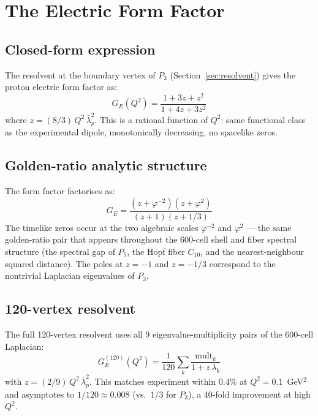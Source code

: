 \documentclass[12pt]{article}
\newcommand{\phig}{\varphi}
\newcommand{\lbar}{\bar{\lambda}}
\begin{document}
\section{The Electric Form Factor}\label{sec:formfactor}

\subsection{Closed-form expression}

The resolvent at the boundary vertex of $P_3$ (Section~\ref{sec:resolvent}) gives the proton electric form factor as:
\begin{equation}\label{eq:formfactor}
    G_E(Q^2) = \frac{1 + 3z + z^2}{1 + 4z + 3z^2}
\end{equation}
where $z = (8/3)\,Q^2\,\lbar_p^2$. This is a rational function of $Q^2$: same functional class as the experimental dipole, monotonically decreasing, no spacelike zeros.

\subsection{Golden-ratio analytic structure}

The form factor factorises as:
\begin{equation}
    G_E = \frac{(z + \phig^{-2})(z + \phig^2)}{(z + 1)(z + 1/3)}
\end{equation}
The timelike zeros occur at the two algebraic scales $\phig^{-2}$ and $\phig^2$ --- the same golden-ratio pair that appears throughout the 600-cell shell and fiber spectral structure (the spectral gap of $P_5$, the Hopf fiber $C_{10}$, and the nearest-neighbour squared distance). The poles at $z = -1$ and $z = -1/3$ correspond to the nontrivial Laplacian eigenvalues of $P_3$.

\subsection{120-vertex resolvent}\label{sec:120vertex}

The full 120-vertex resolvent uses all 9 eigenvalue-multiplicity pairs of the 600-cell Laplacian:
\begin{equation}
    G_E^{(120)}(Q^2) = \frac{1}{120}\sum_k \frac{\mathrm{mult}_k}{1 + z\,\lambda_k}
\end{equation}
with $z = (2/9)\,Q^2\,\lbar_p^2$. This matches experiment within 0.4\% at $Q^2 = 0.1$~GeV$^2$ and asymptotes to $1/120 \approx 0.008$ (vs.\ $1/3$ for $P_3$), a 40-fold improvement at high $Q^2$.
\end{document}
